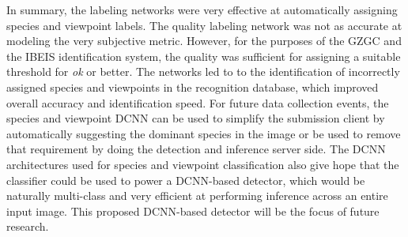 In summary, the labeling networks were very effective at automatically assigning species and viewpoint labels.  The quality labeling network was not as accurate at modeling the very subjective metric.  However, for the purposes of the GZGC and the IBEIS identification system, the quality was sufficient for assigning a suitable threshold for \textit{ok} or better.  The networks led to to the identification of incorrectly assigned species and viewpoints in the recognition database, which improved overall accuracy and identification speed.  For future data collection events, the species and viewpoint DCNN can be used to simplify the submission client by automatically suggesting the dominant species in the image or be used to remove that requirement by doing the detection and inference server side.  The DCNN architectures used for species and viewpoint classification also give hope that the classifier could be used to power a DCNN-based detector, which would be naturally multi-class and very efficient at performing inference across an entire input image.  This proposed DCNN-based detector will be the focus of future research.
